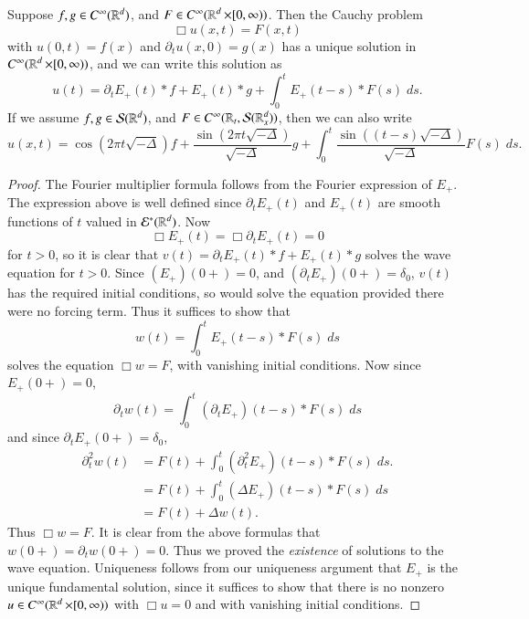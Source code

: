 \begin{theorem}
    Suppose $f,g \in C^\infty(\operatorname{\mathbb{R}}^d)$, and $F \in C^\infty(\operatorname{\mathbb{R}}^d \times [0,\infty))$. Then the Cauchy problem
    \[ \Box u(x,t) = F(x,t) \]
    with $u(0,t) = f(x)$ and $\partial_t u(x,0) = g(x)$ has a unique solution in $C^\infty(\operatorname{\mathbb{R}}^d \times [0,\infty))$, and we can write this solution as
    \[ u(t) = \partial_t E_+(t) * f + E_+(t) * g + \int_0^t E_+(t-s) * F(s)\; ds. \]
    If we assume $f,g \in \mathcal{S}(\operatorname{\mathbb{R}}^d)$, and $F \in C^\infty(\operatorname{\mathbb{R}}_t, \mathcal{S}(\operatorname{\mathbb{R}}^d_x))$, then we can also write
    \[ u(x,t) = \cos(2 \pi t \sqrt{-\Delta}) f + \frac{\sin(2 \pi t \sqrt{-\Delta})}{\sqrt{-\Delta}} g + \int_0^t \frac{\sin((t - s) \sqrt{-\Delta})}{\sqrt{-\Delta}} F(s)\; ds. \]
\end{theorem}
\begin{proof}
    The Fourier multiplier formula follows from the Fourier expression of $E_+$. The expression above is well defined since $\partial_t E_+(t)$ and $E_+(t)$ are smooth functions of $t$ valued in $\mathcal{E}^*(\operatorname{\mathbb{R}}^d)$. Now
    \[ \Box E_+(t) = \Box \partial_t E_+(t) = 0 \]
    for $t > 0$, so it is clear that $v(t) = \partial_t E_+(t) * f + E_+(t) * g$ solves the wave equation for $t > 0$. Since $(E_+)(0+) = 0$, and $(\partial_t E_+)(0+) = \delta_0$, $v(t)$ has the required initial conditions, so would solve the equation provided there were no forcing term. Thus it suffices to show that
    \[ w(t) = \int_0^t E_+(t-s) * F(s)\; ds \]
    solves the equation $\Box w = F$, with vanishing initial conditions. Now since $E_+(0+) = 0$,
    \[ \partial_t w(t) = \int_0^t (\partial_t E_+)(t - s) * F(s)\; ds \]
    and since $\partial_t E_+(0+) = \delta_0$,
    \begin{align*}
        \partial_t^2 w(t) &= F(t) + \int_0^t (\partial_t^2 E_+)(t - s) * F(s)\; ds.\\
        &= F(t) + \int_0^t (\Delta E_+)(t - s) * F(s)\; ds\\
        &= F(t) + \Delta w(t).
    \end{align*}
    Thus $\Box w = F$. It is clear from the above formulas that $w(0+) = \partial_t w(0+) = 0$. Thus we proved the \emph{existence} of solutions to the wave equation. Uniqueness follows from our uniqueness argument that $E_+$ is the unique fundamental solution, since it suffices to show that there is no nonzero $u \in C^\infty(\operatorname{\mathbb{R}}^d \times [0,\infty))$ with $\Box u = 0$ and with vanishing initial conditions.
\end{proof}

